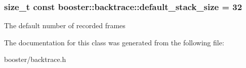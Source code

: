 \subsubsection[{default\-\_\-stack\-\_\-size}]{\setlength{\rightskip}{0pt plus 5cm}size\-\_\-t const {\bf booster\-::backtrace\-::default\-\_\-stack\-\_\-size} = 32\hspace{0.3cm}{\ttfamily  [static]}}\label{classbooster_1_1backtrace_a0e1bcb70bc3845ca8cca8cf53782b048}
\-The default number of recorded frames 

\-The documentation for this class was generated from the following file\-:\begin{DoxyCompactItemize}
\item 
booster/backtrace.\-h\end{DoxyCompactItemize}
